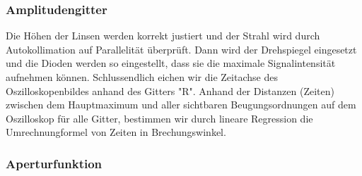 \subsubsection{Amplitudengitter}

Die H\"ohen der Linsen werden korrekt justiert und der Strahl wird durch Autokollimation auf Parallelit\"at \"uberpr\"uft. Dann wird der Drehspiegel eingesetzt und die Dioden werden so eingestellt, dass sie die maximale Signalintensit\"at aufnehmen k\"onnen. Schlussendlich eichen wir die Zeitachse des Oszilloskopenbildes anhand des Gitters "R". Anhand der Distanzen (Zeiten) zwischen dem Hauptmaximum und aller sichtbaren Beugungsordnungen auf dem Oszilloskop f\"ur alle Gitter, bestimmen wir durch lineare Regression die Umrechnungformel von Zeiten in Brechungswinkel.

\subsubsection{Aperturfunktion}

\clearpage